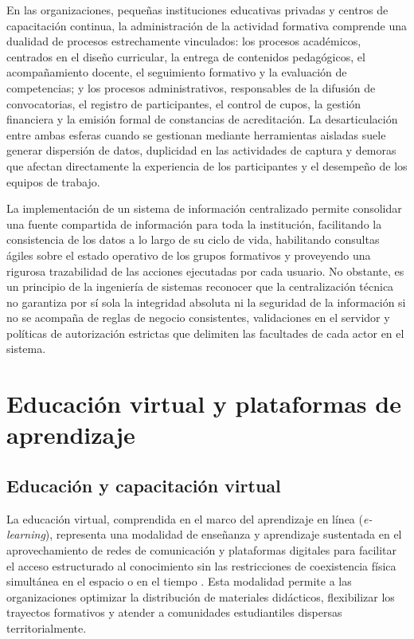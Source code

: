 En las organizaciones, pequeñas instituciones educativas privadas y centros de capacitación continua, la administración de la actividad formativa comprende una dualidad de procesos estrechamente vinculados: los procesos académicos, centrados en el diseño curricular, la entrega de contenidos pedagógicos, el acompañamiento docente, el seguimiento formativo y la evaluación de competencias; y los procesos administrativos, responsables de la difusión de convocatorias, el registro de participantes, el control de cupos, la gestión financiera y la emisión formal de constancias de acreditación. La desarticulación entre ambas esferas cuando se gestionan mediante herramientas aisladas suele generar dispersión de datos, duplicidad en las actividades de captura y demoras que afectan directamente la experiencia de los participantes y el desempeño de los equipos de trabajo.

La implementación de un sistema de información centralizado permite consolidar una fuente compartida de información para toda la institución, facilitando la consistencia de los datos a lo largo de su ciclo de vida, habilitando consultas ágiles sobre el estado operativo de los grupos formativos y proveyendo una rigurosa trazabilidad de las acciones ejecutadas por cada usuario. No obstante, es un principio de la ingeniería de sistemas reconocer que la centralización técnica no garantiza por sí sola la integridad absoluta ni la seguridad de la información si no se acompaña de reglas de negocio consistentes, validaciones en el servidor y políticas de autorización estrictas que delimiten las facultades de cada actor en el sistema.

\section{Educación virtual y plataformas de aprendizaje}

\subsection{Educación y capacitación virtual}

La educación virtual, comprendida en el marco del aprendizaje en línea (\textit{e-learning}), representa una modalidad de enseñanza y aprendizaje sustentada en el aprovechamiento de redes de comunicación y plataformas digitales para facilitar el acceso estructurado al conocimiento sin las restricciones de coexistencia física simultánea en el espacio o en el tiempo \cite{unesco2023technology}. Esta modalidad permite a las organizaciones optimizar la distribución de materiales didácticos, flexibilizar los trayectos formativos y atender a comunidades estudiantiles dispersas territorialmente.

